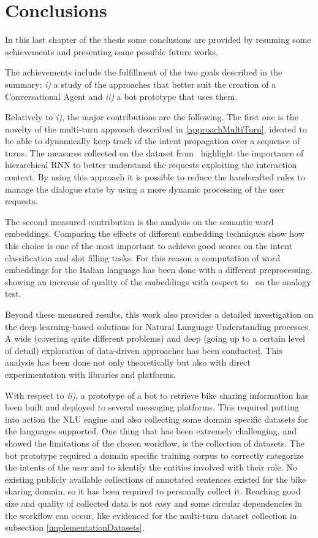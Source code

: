 
\chapter{Conclusions}
\label{conclusion}

In this last chapter of the thesis some conclusions are provided by resuming some achievements and presenting some possible future works.

The achievements include the fulfillment of the two goals described in the summary: \textit{i)} a study of the approaches that better suit the creation of a Conversational Agent and \textit{ii)} a bot prototype that uses them.

Relatively to \textit{i)}, the major contributions are the following. The first one is the novelty of the multi-turn approach described in \ref{approachMultiTurn}, ideated to be able to dynamically keep track of the intent propagation over a sequence of turns. The measures collected on the dataset from~\cite{eric2017key} highlight the importance of hierarchical RNN to better understand the requests exploiting the interaction context. By using this approach it is possible to reduce the handcrafted rules to manage the dialogue state by using a more dynamic processing of the user requests.

The second measured contribution is the analysis on the semantic word embeddings. Comparing the effects of different embedding techniques show how this choice is one of the most important to achieve good scores on the intent classification and slot filling tasks. For this reason a computation of word embeddings for the Italian language has been done with a different preprocessing, showing an increase of quality of the embeddings with respect to~\cite{berardi2015word} on the analogy test.

Beyond these measured results, this work also provides a detailed investigation on the deep learning-based solutions for Natural Language Understanding processes. A wide (covering quite different problems) and deep (going up to a certain level of detail) exploration of data-driven approaches has been conducted. This analysis has been done not only theoretically but also with direct experimentation with libraries and platforms.

With respect to \textit{ii)}, a prototype of a bot to retrieve bike sharing information has been built and deployed to several messaging platforms. This required putting into action the NLU engine and also collecting some domain specific datasets for the languages supported. One thing that has been extremely challenging, and showed the limitations of the chosen workflow, is the collection of datasets. The bot prototype required a domain specific training corpus to correctly categorize the intents of the user and to identify the entities involved with their role. No existing publicly available collections of annotated sentences existed for the bike sharing domain, so it has been required to personally collect it. Reaching good size and quality of collected data is not easy and some circular dependencies in the workflow can occur, like evidenced for the multi-turn dataset collection in subsection \ref{implementationDatasets}.

